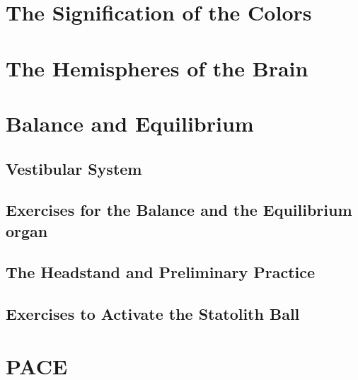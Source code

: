 \documentclass[../main.tex]{subfiles}
\begin{document}




\chapter{The Signification of the Colors}



\chapter{The Hemispheres of the Brain}



\chapter{Balance and Equilibrium}



\section{Vestibular System}



\newpage
\section[Balance Exercises]{Exercises for the Balance and the Equilibrium organ}



\section[Headstand]{The Headstand and Preliminary Practice}



\section{Exercises to Activate the Statolith Ball}



\chapter{PACE}


\end{document}
